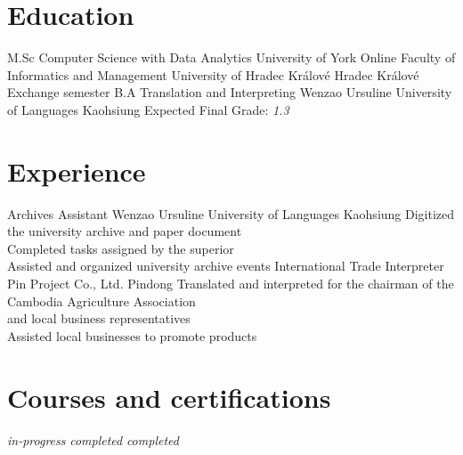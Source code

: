 \documentclass[10pt,a4paper,sans]{moderncv}
\begin{document}
\makecvtitle

\section{Education}
		{M.Sc Computer Science with Data Analytics}
		{University of York}
		{Online}
		{}
		{}
		{Faculty of Informatics and Management}
		{University of Hradec Králové}
		{Hradec Králové}
		{Exchange semester}
		{}
        {B.A Translation and Interpreting}
        {Wenzao Ursuline University of Languages}
        {Kaohsiung}
        {}
        {Expected Final Grade: \emph{1.3}}

\section{Experience}
        {Archives Assistant}
        {Wenzao Ursuline University of Languages}
        {Kaohsiung}
        {}
        {Digitized the university archive and paper document\\
        	Completed tasks assigned by the superior\\
        	Assisted and organized university archive events}
        {International Trade Interpreter}
        {Pin Project Co., Ltd.}
        {Pindong}
        {}
        {Translated and interpreted for the chairman of the Cambodia Agriculture Association\\
        	and local business representatives\\
        	Assisted local businesses to promote products}


\section{Courses and certifications}
				  {\textit{in-progress}}
				  {}
                  {}
                  {}
				  {}
				  {}
				  {\textit{completed}}
                  {}
				  {\textit{completed}}
                  {}
\end{document}
